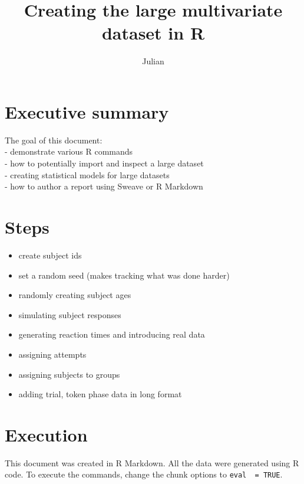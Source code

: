 \documentclass[]{article}
\title{Creating the large multivariate dataset in R}
\author{Julian}
\date{}
\begin{document}
\maketitle


{
\hypersetup{linkcolor=black}
\setcounter{tocdepth}{2}
\tableofcontents
}
\section{Executive summary}\label{executive-summary}

The goal of this document:\\- demonstrate various R commands\\- how to
potentially import and inspect a large dataset\\- creating statistical
models for large datasets\\- how to author a report using Sweave or R
Markdown

\section{Steps}\label{steps}

\begin{itemize}
\itemsep1pt\parskip0pt
\item
  create subject ids\\
\item
  set a random seed (makes tracking what was done harder)\\
\item
  randomly creating subject ages\\
\item
  simulating subject responses\\
\item
  generating reaction times and introducing real data\\
\item
  assigning attempts\\
\item
  assigning subjects to groups\\
\item
  adding trial, token phase data in long format
\end{itemize}

\section{Execution}\label{execution}

This document was created in R Markdown. All the data were generated
using R code. To execute the commands, change the chunk options to
\texttt{eval\ \ =\ TRUE}.
\end{document}
